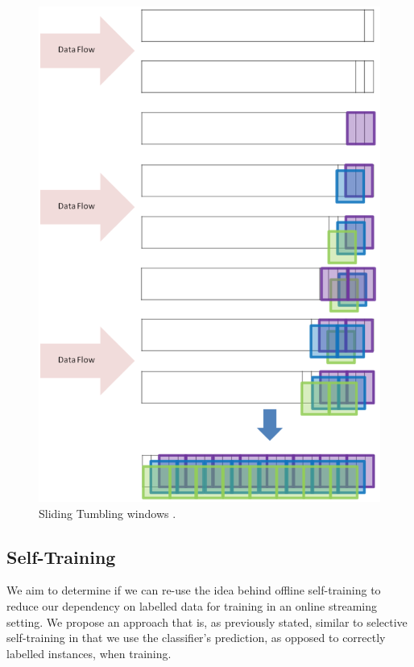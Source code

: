 \documentclass[runningheads]{llncs}
\begin{document}
\begin{figure}
  \includegraphics[width=\linewidth]{./images/chapter3/sliding_tumbling_windows}
  \caption{Sliding Tumbling windows \citep{d2016fine}.}
  \label{fig:sliding_tumbling_windows}
\end{figure}

\subsection{Self-Training}
We aim to determine if we can re-use the idea behind offline self-training to reduce our dependency on labelled data for training in an online streaming setting. We propose an approach that is, as previously stated, similar to selective self-training in that we use the classifier's prediction, as opposed to correctly labelled instances, when training.
\end{document}
